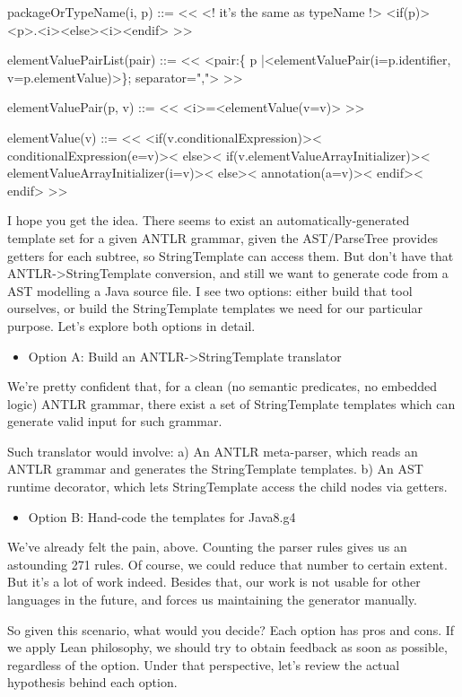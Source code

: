 \documentclass[11pt]{article}
\begin{document}
packageOrTypeName(i, p) ::= << <! it's the same as typeName !>
<if(p)><p>.<i><else><i><endif>
>>

elementValuePairList(pair) ::= <<
<pair:\{ p |<elementValuePair(i=p.identifier, v=p.elementValue)>\}; separator=",">
>>

elementValuePair(p, v) ::= <<
<i>=<elementValue(v=v)>
>>

elementValue(v) ::= <<
<if(v.conditionalExpression)><
  conditionalExpression(e=v)><
else><
  if(v.elementValueArrayInitializer)><
    elementValueArrayInitializer(i=v)><
  else><
    annotation(a=v)><
  endif><
endif>
>>

I hope you get the idea. There seems to exist an automatically-generated template set for a given ANTLR grammar, given the AST/ParseTree
provides getters for each subtree, so StringTemplate can access them.
But don't have that ANTLR->StringTemplate conversion, and still we want to generate code from a AST modelling a Java source file.
I see two options: either build that tool ourselves, or build the StringTemplate templates we need for our particular purpose.
Let's explore both options in detail.

\begin{itemize}
\item Option A: Build an ANTLR->StringTemplate translator
\end{itemize}

We're pretty confident that, for a clean (no semantic predicates, no embedded logic) ANTLR grammar, there exist a
set of StringTemplate templates which can generate valid input for such grammar.

Such translator would involve:
a) An ANTLR meta-parser, which reads an ANTLR grammar and generates the StringTemplate templates.
b) An AST runtime decorator, which lets StringTemplate access the child nodes via getters.

\begin{itemize}
\item Option B: Hand-code the templates for Java8.g4
\end{itemize}

We've already felt the pain, above. Counting the parser rules gives us an astounding 271 rules. Of course, we could
reduce that number to certain extent. But it's a lot of work indeed. Besides that, our work is not usable for other languages
in the future, and forces us maintaining the generator manually.

So given this scenario, what would you decide? Each option has pros and cons. If we apply Lean philosophy, we should try to
obtain feedback as soon as possible, regardless of the option. Under that perspective, let's review the actual hypothesis behind
each option.
\end{document}
